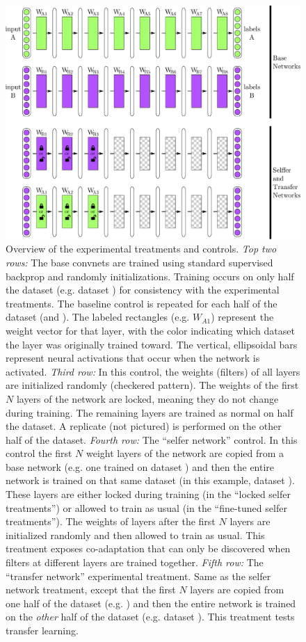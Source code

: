 \begin{figure}[htpb]
\begin{center}
\includegraphics[width=1\linewidth]{drawings/transfer.pdf}
\end{center}
\caption{Overview of the experimental treatments and controls. \emph{Top two rows:} The base convnets are trained using standard supervised backprop and randomly initializations. Training occurs on only half the dataset (e.g. dataset \dA) for consistency with the experimental treatments. The baseline control is repeated for each half of the dataset (\dA and \dB). The labeled rectangles (e.g. $W_{A1}$) represent the weight vector for that layer, with the color indicating which dataset the layer was originally trained toward. The vertical, ellipsoidal bars represent neural activations that occur when the network is activated. \emph{Third row:} In this control, the weights (filters) of all layers are initialized randomly (checkered pattern). The weights of the first $N$ layers of the network are locked, meaning they do not change during training. The remaining layers are trained as normal on half the dataset. A replicate (not pictured) is performed on the other half of the dataset. \emph{Fourth row:} The ``selfer network'' control. In this control the first $N$ weight layers of the network are copied from a base network (e.g. one trained on dataset \dB) and then the entire network is trained on that same dataset (in this example, dataset \dB). These layers are either locked during training (in the ``locked selfer treatments'') or allowed to train as usual (in the ``fine-tuned selfer treatments''). The weights of layers after the first $N$ layers are initialized randomly and then allowed to train as usual. This treatment exposes co-adaptation that can only be discovered when filters at different layers are trained together. \emph{Fifth row:} The ``transfer network'' experimental treatment. Same as the selfer network treatment, except that the first $N$ layers are copied from one half of the dataset (e.g. \dA) and then the entire network is trained on the \emph{other} half of the dataset (e.g. dataset \dB). This treatment tests transfer learning.}
\label{fig:transfer}
\end{figure}


